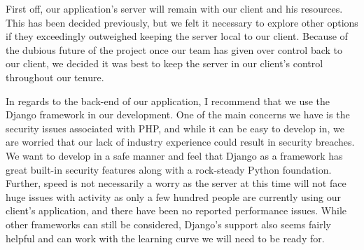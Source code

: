 \documentclass[onecolumn, draftclsnofoot,10pt, compsoc]{IEEEtran}
\begin{document}
First off, our application’s server will remain with our client and his resources. This has been decided previously, but we felt it necessary to explore other options if they exceedingly outweighed keeping the server local to our client. Because of the dubious future of the project once our team has given over control back to our client, we decided it was best to keep the server in our client’s control throughout our tenure. 

In regards to the back-end of our application, I recommend that we use the Django framework in our development. One of the main concerns we have is the security issues associated with PHP, and while it can be easy to develop in, we are worried that our lack of industry experience could result in security breaches. We want to develop in a safe manner and feel that Django as a framework has great built-in security features along with a rock-steady Python foundation. Further, speed is not necessarily a worry as the server at this time will not face huge issues with activity as only a few hundred people are currently using our client’s application, and there have been no reported performance issues. While other frameworks can still be considered, Django’s support also seems fairly helpful and can work with the learning curve we will need to be ready for.



\end{document}
